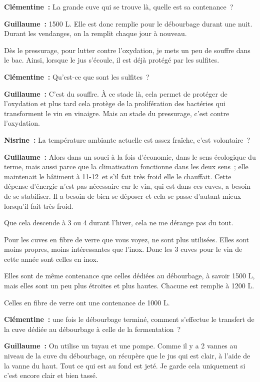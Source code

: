 \documentclass[a4paper, titlepage]{report}
\begin{document}
\textbf{Clémentine~:} La grande cuve
qui se trouve là, quelle est sa contenance~?

\textbf{Guillaume~:} 1500 L. Elle est donc remplie pour le débourbage
durant une nuit. Durant les vendanges, on la remplit chaque jour à
nouveau.

Dès le pressurage, pour lutter contre l'oxydation, je mets un peu de
souffre dans le bac. Ainsi, lorsque le jus s'écoule, il est déjà protégé
par les sulfites.

\textbf{Clémentine~:} Qu'est-ce que sont les sulfites~?

\textbf{Guillaume~:} C'est du souffre. À ce stade là, cela permet de
protéger de l'oxydation et plus tard cela protège de la prolifération
des bactéries qui transforment le vin en vinaigre. Mais au stade du
pressurage, c'est contre l'oxydation.

\textbf{Nisrine~:} La température ambiante actuelle est assez fraîche,
c'est volontaire~?

\textbf{Guillaume~:} Alors dans un souci à la fois d'économie, dans le
sens écologique du terme, mais aussi parce que la climatisation
fonctionne dans les deux sens~; elle maintenait le bâtiment à 11-12\textdegree\ et
s'il fait très froid elle le chauffait. Cette dépense d'énergie n'est
pas nécessaire car le vin, qui est dans ces cuves, a besoin de se
stabiliser. Il a besoin de bien se déposer et cela se passe d'autant
mieux lorsqu'il fait très froid.

Que cela descende à 3 ou 4\textdegree{} durant l'hiver, cela ne me dérange pas du
tout.

Pour les cuves en fibre de verre que vous voyez, ne sont plus utilisées.
Elles sont moins propres, moins intéressantes que l'inox. Donc les 3
cuves pour le vin de cette année sont celles en inox.

Elles sont de même contenance que celles dédiées au débourbage, à savoir
1500 L, mais elles sont un peu plus étroites et plus hautes. Chacune est
remplie à 1200 L.

Celles en fibre de verre ont une contenance de 1000 L.

\textbf{Clémentine~:} une fois le débourbage terminé, comment s'effectue
le transfert de la cuve dédiée au débourbage à celle de la
fermentation~?

\textbf{Guillaume~:} On utilise un tuyau et une pompe. Comme il y a 2
vannes au niveau de la cuve du débourbage, on récupère que le jus qui
est clair, à l'aide de la vanne du haut. Tout ce qui est au fond est
jeté. Je garde cela uniquement si c'est encore clair et bien tassé.
\end{document}
